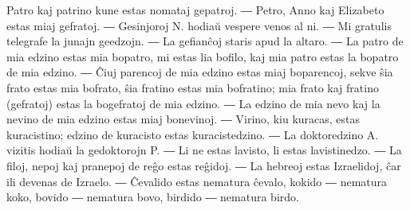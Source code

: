 \begin{samepage}

Patro kaj patrino kune estas nomataj gepatroj. ― Petro, Anno kaj Elizabeto estas miaj gefratoj. ― Gesinjoroj N. hodiaŭ vespere venos al ni. ― Mi gratulis telegrafe la junajn geedzojn. ― La gefianĉoj staris apud la altaro. ― La patro de mia edzino estas mia bopatro, mi estas lia bofilo, kaj mia patro estas la bopatro de mia edzino. ― Ĉiuj parencoj de mia edzino estas miaj boparencoj, sekve ŝia frato estas mia bofrato, ŝia fratino estas mia bofratino; mia frato kaj fratino (gefratoj) estas la bogefratoj de mia edzino. ― La edzino de mia nevo kaj la nevino de mia edzino estas miaj bonevinoj. ― Virino, kiu kuracas, estas kuracistino; edzino de kuracisto estas kuracistedzino. ― La doktoredzino A. vizitis hodiaŭ la gedoktorojn P. ― Li ne estas lavisto, li estas lavistinedzo. ― La filoj, nepoj kaj pranepoj de reĝo estas reĝidoj. ― La hebreoj estas Izraelidoj, ĉar ili devenas de Izraelo. ― Ĉevalido estas nematura ĉevalo, kokido ― nematura koko, bovido ― nematura bovo, birdido ― nematura birdo.
\end{samepage}

